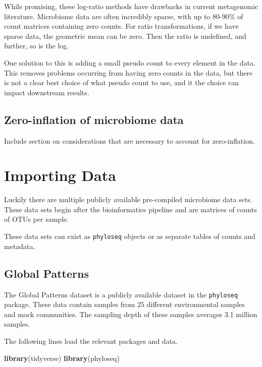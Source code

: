 \documentclass[
]{book}
\newenvironment{Shaded}{\begin{snugshade}}{\end{snugshade}}
\newcommand{\KeywordTok}[1]{\textcolor[rgb]{0.13,0.29,0.53}{\textbf{#1}}}
\newcommand{\NormalTok}[1]{#1}
\begin{document}
While promising, these log-ratio methods have drawbacks in current metagenomic literature. Microbiome data are often incredibly sparse, with up to 80-90\% of count matrices containing zero counts. For ratio transformations, if we have sparse data, the geometric mean can be zero. Then the ratio is undefined, and further, so is the log.

One solution to this is adding a small pseudo count to every element in the data. This removes problems occurring from having zero counts in the data, but there is not a clear best choice of what pseudo count to use, and it the choice can impact downstream results.

\hypertarget{zero-inflation-of-microbiome-data}{%
\section{Zero-inflation of microbiome data}\label{zero-inflation-of-microbiome-data}}

Include section on considerations that are necessary to account for zero-inflation.

\hypertarget{importing-data}{%
\chapter{Importing Data}\label{importing-data}}

Luckily there are multiple publicly available pre-compiled microbiome data sets. These data sets begin after the bioinformatics pipeline and are matrices of counts of OTUs per sample.

These data sets can exist as \texttt{phyloseq} objects or as separate tables of counts and metadata.

\hypertarget{global-patterns}{%
\section{Global Patterns}\label{global-patterns}}

The Global Patterns dataset is a publicly available dataset in the \texttt{phyloseq} package. These data contain samples from 25 different environmental samples and mock communities. The sampling depth of these samples averages 3.1 million samples.

The following lines load the relevant packages and data.

\begin{Shaded}
\begin{Highlighting}[]
\KeywordTok{library}\NormalTok{(tidyverse)}
\KeywordTok{library}\NormalTok{(phyloseq)}
\end{Highlighting}
\end{Shaded}
\end{document}
